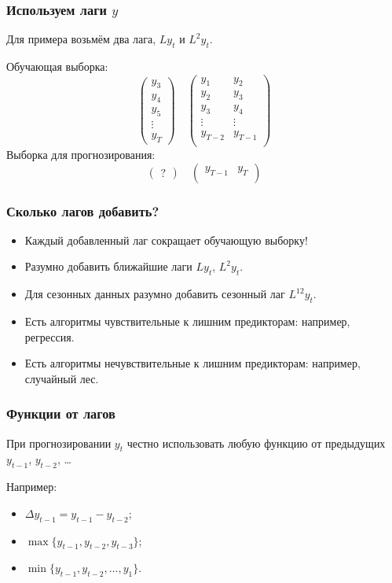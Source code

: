 \begin{frame}
  \frametitle{Используем лаги $y$}

  Для примера возьмём два лага, $Ly_t$ и $L^2 y_t$.
  \pause

  \alert{Обучающая} выборка:
  \[
  \begin{pmatrix}
    y_3 \\
    y_4 \\
    y_5 \\
    \vdots \\
    y_T 
  \end{pmatrix}  \quad 
  \begin{pmatrix}
    y_1 & y_2 \\
    y_2 & y_3 \\
    y_3 & y_4 \\
    \vdots & \vdots \\
    y_{T-2} & y_{T-1} \\ 
  \end{pmatrix}
  \]
  \pause
  Выборка для \alert{прогнозирования}:
  \[
  \begin{pmatrix}
    ? 
  \end{pmatrix}  \quad 
  \begin{pmatrix}
    y_{T-1} & y_{T} \\ 
  \end{pmatrix}
  \]
  
\end{frame}

\begin{frame}
  \frametitle{Сколько лагов добавить?}

  \begin{itemize}[<+->]
    \item Каждый добавленный лаг \alert{сокращает} обучающую выборку!
    \item Разумно добавить \alert{ближайшие лаги} $Ly_t$, $L^2y_t$.
    \item Для сезонных данных разумно добавить \alert{сезонный лаг} $L^{12} y_t$.
    \item Есть алгоритмы \alert{чувствительные к лишним предикторам}: например, регрессия. 
    \item Есть алгоритмы \alert{нечувствительные к лишним предикторам}: например, случайный лес.
  \end{itemize}
\end{frame}

\begin{frame}
  \frametitle{Функции от лагов}
  При прогнозировании $y_{t}$ \alert{честно} использовать любую функцию от \alert{предыдущих} $y_{t-1}$, $y_{t-2}$, \ldots

  \pause

  Например:
  \begin{itemize}[<+->]
    \item $\Delta y_{t-1} = y_{t-1} - y_{t-2}$;
    \item $\max\{ y_{t-1}, y_{t-2}, y_{t-3} \}$;
    \item $\min\{ y_{t-1}, y_{t-2}, \ldots, y_1\}$.
  \end{itemize}
\end{frame}

